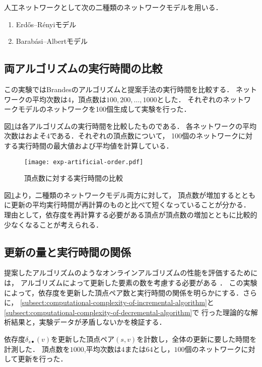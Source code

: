 人工ネットワークとして次の二種類のネットワークモデルを用いる．
\begin{enumerate}
\item Erd\H{o}s--R\'{e}nyiモデル\cite{Erdos1959}
\item Barab\'{a}si--Albertモデル\cite{Barabasi1999}
\end{enumerate}

\subsection{両アルゴリズムの実行時間の比較}
この実験ではBrandesのアルゴリズムと提案手法の実行時間を比較する．
ネットワークの平均次数は$4$，頂点数は$100,200,\ldots,1000$とした．
それぞれのネットワークモデルのネットワークを100個生成して実験を行った．

図\ref{fig:exp-artificial-order}は各アルゴリズムの実行時間を比較したものである．
各ネットワークの平均次数はおよそ$4$である．それぞれの頂点数について，
100個のネットワークに対する実行時間の最大値および平均値を計算している．

\begin{figure}[tb]
  \centering
  \texttt{[image: exp-artificial-order.pdf]}
  \caption{頂点数に対する実行時間の比較}
  \label{fig:exp-artificial-order}
\end{figure}

図\ref{fig:exp-artificial-order}より，二種類のネットワークモデル両方に対して，
頂点数が増加するとともに更新の平均実行時間が再計算のものと比べて短くなっていることが分かる．
理由として，依存度を再計算する必要がある頂点が頂点数の増加とともに比較的少なくなることが考えられる．

\subsection{更新の量と実行時間の関係}

提案したアルゴリズムのようなオンラインアルゴリズムの性能を評価するためには，
アルゴリズムによって更新した要素の数を考慮する必要がある
\cite{Ramalingam1996,Lee2012,Pontecorvi2014}．
この実験によって，依存度を更新した頂点ペア数と実行時間の関係を明らかにする．さらに，
\ref{subsect:computational-complexity-of-incremental-algorithm}と
\ref{subsect:computational-complexity-of-decremental-algorithm}で
行った理論的な解析結果と，実験データが矛盾しないかを検証する．

依存度$\delta_{s\bullet}(v)$を更新した頂点ペア$(s,v)$を計数し，全体の更新に要した時間を計測した．
頂点数を$1000$,平均次数は$4$または$64$とし，$100$個のネットワークに対して更新を行った．

